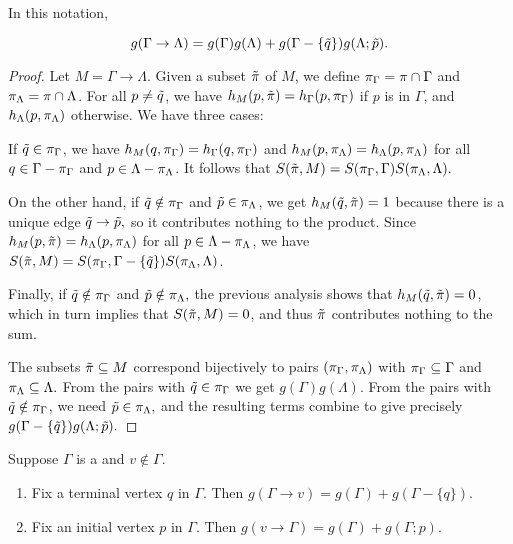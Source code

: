\begin{prop}
	In this notation, \begin{enumrealm}\begin{equation*} g(\Gamma \rightarrow \Lambda) = g(\Gamma)g(\Lambda) + g(\Gamma - \{\tilde{q}\})g(\Lambda; \tilde{p}). \end{equation*}\end{enumrealm}
\end{prop}
\begin{proof}
	Let $M = \Gamma \rightarrow \Lambda.$ Given a subset $\tilde{\pi}$ of $M$, we define $\pi_\Gamma = \pi \cap \Gamma$ and $\pi_\Lambda = \pi \cap \Lambda$. For all $p \neq \tilde{q}$, we have $h_M(p, \tilde{\pi}) = h_\Gamma(p, \pi_\Gamma)$ if $p$ is in $\Gamma$, and $h_\Lambda(p, \pi_\Lambda)$ otherwise. We have three cases:
	
	
	If $\tilde{q} \in \pi_\Gamma$, we have $h_M(q, \pi_\Gamma) = h_\Gamma(q, \pi_\Gamma)$ and $h_M(p, \pi_\Lambda) = h_\Lambda(p, \pi_\Lambda)$ for all $q \in \Gamma - \pi_\Gamma$ and $p \in \Lambda - \pi_\Lambda$. It follows that $S(\tilde{\pi}, M) = S(\pi_\Gamma, \Gamma)S(\pi_\Lambda, \Lambda).$
	
	On the other hand, if $\tilde{q}\notin\pi_\Gamma$ and $\tilde{p} \in \pi_\Lambda$, we get $h_M(\tilde{q}, \tilde{\pi}) = 1$ because there is a unique edge $\tilde{q} \rightarrow \tilde{p},$ so it contributes nothing to the product. Since $h_M(p, \tilde{\pi}) = h_\Lambda(p, \pi_\Lambda)$ for all $p \in \Lambda - \pi_\Lambda$, we have $S(\tilde{\pi}, M) = S(\pi_\Gamma, \Gamma - \{\tilde{q}\})S(\pi_\Lambda, \Lambda)$.
	
	Finally, if $\tilde{q} \notin \pi_\Gamma$ and $\tilde{p}\notin\pi_\Lambda,$ the previous analysis shows that $h_M(\tilde{q}, \tilde{\pi}) = 0$, which in turn implies that $S(\tilde{\pi}, M) = 0$, and thus $\tilde{\pi}$ contributes nothing to the sum.
	
	The subsets $\tilde{\pi} \subseteq M$ correspond bijectively to pairs $(\pi_\Gamma, \pi_\Lambda)$ with $\pi_\Gamma \subseteq \Gamma$ and $\pi_\Lambda \subseteq \Lambda.$ From the pairs with $\tilde{q} \in \pi_\Gamma$ we get $g(\Gamma)g(\Lambda)$. From the pairs with $\tilde{q} \notin \pi_\Gamma$, we need $\tilde{p} \in \pi_\Lambda,$ and the resulting terms combine to give precisely $g(\Gamma - \{\tilde{q}\})g(\Lambda; \tilde{p}).$
\end{proof}

\begin{cor} Suppose $\Gamma$ is a  and $v \notin \Gamma$.\listspace
	\begin{enumerate} \listspace
		\item Fix a terminal vertex $q$ in $\Gamma$. Then $g(\Gamma \rightarrow v) = g(\Gamma) + g(\Gamma - \{q\}).$
		\item Fix an initial vertex $p$ in $\Gamma.$ Then $g(v \rightarrow \Gamma) = g(\Gamma) + g(\Gamma; p).$
	\end{enumerate}\textspace
\end{cor}

